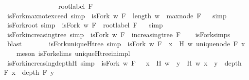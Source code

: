 \begin{isabellebody}
\ \ \ \ \ \ \ \ \ \ \ \ \ \ \ {\isasymand}\ root{\isacharunderscore}label{}\ F{\isacharparenright}{\isachardoublequoteclose}\isanewline
\isanewline
{}\isamarkupfalse%
\ isFork{\isacharunderscore}max{\isacharunderscore}not{\isacharunderscore}exceed\ {\isacharbrackleft}simp{\isacharbrackright}\ {\isacharcolon}\ {\isachardoublequoteopen}isFork\ w\ F\ {\isasymlongrightarrow}\ length\ w\ {\isasymge}\ max{\isacharunderscore}node\ F{\isachardoublequoteclose}%
\isadelimproof
\ %
\endisadelimproof
%
\isatagproof
{}\isamarkupfalse%
\ simp%
\endisatagproof
{\isafoldproof}%
%
\isadelimproof
%
\endisadelimproof
\isanewline
\isanewline
{}\isamarkupfalse%
\ isFork{\isacharunderscore}root{\isacharunderscore}{}\ {\isacharbrackleft}simp{\isacharbrackright}\ {\isacharcolon}\ {\isachardoublequoteopen}isFork\ w\ F\ {\isasymlongrightarrow}\ root{\isacharunderscore}label{}\ F{\isachardoublequoteclose}%
\isadelimproof
\ %
\endisadelimproof
%
\isatagproof
{}\isamarkupfalse%
\ simp%
\endisatagproof
{\isafoldproof}%
%
\isadelimproof
%
\endisadelimproof
\isanewline
\isanewline
{}\isamarkupfalse%
\ isFork{\isacharunderscore}increasing{\isacharunderscore}tree\ {\isacharbrackleft}simp{\isacharbrackright}\ {\isacharcolon}\ {\isachardoublequoteopen}isFork\ w\ F\ {\isasymlongrightarrow}\ increasing{\isacharunderscore}tree\ F{\isachardoublequoteclose}\isanewline
%
\isadelimproof
\ \ %
\endisadelimproof
%
\isatagproof
{}\isamarkupfalse%
\ isFork{\isachardot}simps\ \isamarkupfalse%
\ blast%
\endisatagproof
{\isafoldproof}%
%
\isadelimproof
\ \isanewline
%
\endisadelimproof
\ \ \ \ \isanewline
{}\isamarkupfalse%
\ isFork{\isacharunderscore}uniqueH{\isacharunderscore}tree\ {\isacharbrackleft}simp{\isacharbrackright}\ {\isacharcolon}\ {\isachardoublequoteopen}isFork\ w\ F\ {\isasymlongrightarrow}\ {\isacharparenleft}{\isasymforall}x\ {\isasymin}\ H\ w{\isachardot}\ unique{\isacharunderscore}node\ F\ x{\isacharparenright}{\isachardoublequoteclose}\isanewline
%
\isadelimproof
\ \ %
\endisadelimproof
%
\isatagproof
{}\isamarkupfalse%
\ {\isacharparenleft}meson\ isFork{\isachardot}elims{\isacharparenleft}{}{\isacharparenright}\ uniqueH{\isacharunderscore}tree{\isacharunderscore}in{\isacharunderscore}imp{\isacharunderscore}l{\isacharparenright}%
\endisatagproof
{\isafoldproof}%
%
\isadelimproof
\isanewline
%
\endisadelimproof
\isanewline
{}\isamarkupfalse%
\ isFork{\isacharunderscore}increasing{\isacharunderscore}depth{\isacharunderscore}H\ {\isacharbrackleft}simp{\isacharbrackright}\ {\isacharcolon}\ {\isachardoublequoteopen}isFork\ w\ F\ {\isasymlongrightarrow}\ {\isacharparenleft}{\isasymforall}\ x\ {\isasymin}\ H\ w{\isachardot}\ {\isasymforall}\ y\ {\isasymin}\ H\ w{\isachardot}\ x\ {\isacharless}\ y\ {\isasymlongrightarrow}\ depth\ F\ x\ {\isacharless}\ depth\ F\ y{\isacharparenright}{\isachardoublequoteclose}\isanewline

\end{isabellebody}
